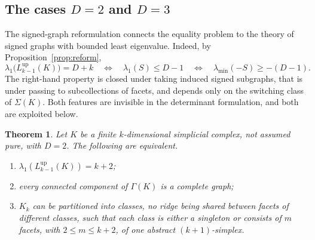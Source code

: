 \documentclass[11pt,reqno]{amsart}
\numberwithin{equation}{section}
\theoremstyle{plain}
\newtheorem{theorem}{Theorem}[section]
\theoremstyle{definition}
\newcommand{\Lup}{L^{\mathrm{up}}}
\begin{document}
\subsection{The cases \texorpdfstring{$D=2$ and $D=3$}{D=2 and D=3}}

The signed-graph reformulation connects the equality problem to the theory of signed graphs with
bounded least eigenvalue. Indeed, by Proposition~\ref{prop:reform},
\begin{equation}\label{eq:lmin}
  \lambda_1\bigl(\Lup_{k-1}(K)\bigr)=D+k
  \quad\Longleftrightarrow\quad
  \lambda_1(S)\le D-1
  \quad\Longleftrightarrow\quad
  \lambda_{\min}(-S)\ge-(D-1).
\end{equation}
The right-hand property is closed under taking induced signed subgraphs, that is under passing to
subcollections of facets, and depends only on the switching class of $\Sigma(K)$. Both features
are invisible in the determinant formulation, and both are exploited below.

\begin{theorem}\label{thm:D2}
Let $K$ be a finite $k$-dimensional simplicial complex, not assumed pure, with $D=2$. The
following are equivalent.
\begin{enumerate}[label=\textup{(\alph*)},leftmargin=2.6em]
\item\label{it:D2a} $\lambda_1(\Lup_{k-1}(K))=k+2$;
\item\label{it:D2b} every connected component of $\Gamma(K)$ is a complete graph;
\item\label{it:D2c} $K_k$ can be partitioned into classes, no ridge being shared between facets
of different classes, such that each class is either a singleton or consists of $m$ facets, with
$2\le m\le k+2$, of one abstract $(k+1)$-simplex.
\end{enumerate}
\end{theorem}
\end{document}
